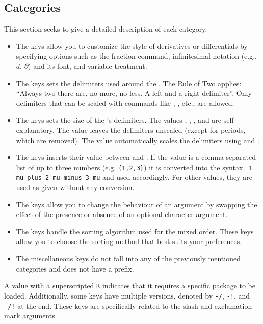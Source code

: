 \subsection{Categories}
This section seeks to give a detailed description of each category.

\begin{itemize}
	\item The  keys allow you to customize the style of derivatives or differentials by specifying options such as the fraction command, infinitesimal notation (e.g., $d$, $\partial$) and its font, and variable treatment.
	\item The  keys sets the delimiters used around the \meta{\dots}. The Rule of Two applies: \enquote{Always two there are, no more, no less. A left and a right delimiter}. Only delimiters that can be scaled with commands like , , etc., are allowed.
	\item The  keys sets the size of the \meta{\dots}'s delimiters. The values , , , and  are self-explanatory. The value  leaves the delimiters unscaled (except for periods, which are removed). The value  automatically scales the delimiters using  and .
	\item The  keys inserts their value between \meta{\dots} and \meta{\dots}. If the value is a comma-separated list of up to three numbers (e.g. \texttt{\{1,2,3\}}) it is converted into the syntax \texttt{ 1 mu plus 2 mu minus 3 mu} and used accordingly. For other values, they are used as given without any conversion.
	\item The  keys allow you to change the behaviour of an argument by swapping the effect of the presence or absence of an optional character argument.
	\item The  keys handle the sorting algorithm used for the mixed order. These keys allow you to choose the sorting method that best suits your preferences.
	\item The miscellaneous keys do not fall into any of the previously mentioned categories and does not have a prefix.
\end{itemize}

\begin{note}
	A value with a superscripted \texttt{R} indicates that it requires a specific package to be loaded. Additionally, some keys have multiple versions, denoted by \texttt{-/}, \texttt{-!}, and \texttt{-/!} at the end. These keys are specifically related to the slash and exclamation mark arguments. 
\end{note}

